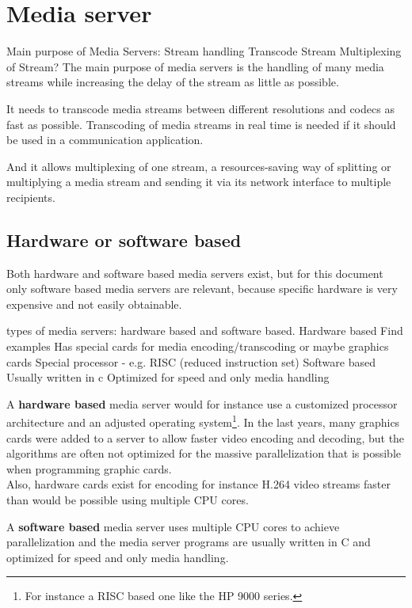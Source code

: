 \documentclass[../../../thesis.tex]{subfiles}
\begin{document}
\section{Media server}

\comment
Main purpose of Media Servers: Stream handling
	Transcode Stream
	Multiplexing of Stream?
\endcomment
The main purpose of media servers is the handling of many media streams while increasing the delay of the stream as little as possible.\par
It needs to transcode media streams between different resolutions and codecs as fast as possible. Transcoding of media streams in real time is needed if it should be used in a communication application.\par
And it allows multiplexing of one stream, a resources-saving way of splitting or multiplying a media stream and sending it via its network interface to multiple recipients.

\subsection{Hardware or software based}
Both hardware and software based media servers exist, but for this document only software based media servers are relevant, because specific hardware is very expensive and not easily obtainable.\par

 types of media servers: hardware based and software based.
Hardware based 
	Find examples
	Has special cards for media encoding/transcoding or maybe graphics cards
	Special processor - e.g. RISC (reduced instruction set)
Software based
	Usually written in c
	Optimized for speed and only media handling
\endcomment

A \textbf{hardware based} media server would for instance use a customized processor architecture and an adjusted operating system\footnote{For instance a RISC based one like the HP 9000 series\cite{risc-example}.}. In the last years, many graphics cards were added to a server to allow faster video encoding and decoding, but the algorithms are often not optimized for the massive parallelization that is possible when programming graphic cards.\\
Also, hardware cards exist for encoding for instance H.264 video streams faster than would be possible using multiple CPU cores.\par

A \textbf{software based} media server uses multiple CPU cores to achieve parallelization and the media server programs are usually written in C and optimized for speed and only media handling.\par
\end{document}
